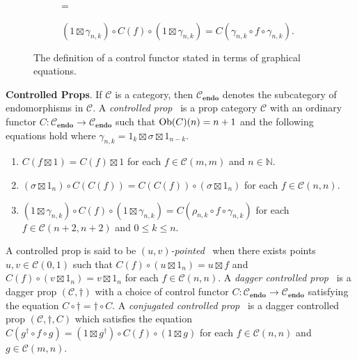 \begin{figure}[t]
    \begin{subfigure}[b]{0.55\textwidth}
        \centering
        =
        \vspace{-0.5em}
        \caption{$( 1 \boxtimes \gamma_{n,k} ) \circ C( f ) \circ ( 1 \boxtimes \gamma_{n,k} ) = C( \gamma_{n,k} \circ f \circ \gamma_{n,k} )$.}
        \label{Fig:ControlDefn:DataSym}
    \end{subfigure}
    \caption{The definition of a control functor stated in terms of graphical equations.}
    \label{Fig:ControlDefn}
\end{figure}

\vspace{1em}
\noindent
\textbf{Controlled Props}.
%
If $\mathcal{C}$ is a category, then $\mathcal{C}_{\mathbf{endo}}$ denotes the subcategory of endomorphisms in $\mathcal{C}$.
A \emph{controlled prop}~\cite{Delorme2025} is a prop category $\mathcal{C}$ with an ordinary functor $C: \mathcal{C}_{\mathbf{endo}} \to \mathcal{C}_{\mathbf{endo}}$ such that $\operatorname{Ob}( C )( n ) = n + 1$ and the following equations hold where $\gamma_{n,k} = 1_k \boxtimes \sigma \boxtimes 1_{n-k}$.
\begin{enumerate}
\item $C( f \boxtimes 1 ) = C( f ) \boxtimes 1$ for each $f \in \mathcal{C}( m, m )$ and $n \in \mathbb{N}$.
\item $( \sigma \boxtimes 1_n ) \circ C( C( f ) ) = C( C( f ) ) \circ ( \sigma \boxtimes 1_n )$ for each $f \in \mathcal{C}( n, n )$.
\item $( 1 \boxtimes \gamma_{n,k} ) \circ C( f ) \circ ( 1 \boxtimes \gamma_{n,k} ) = C( \rho_{n,k} \circ f \circ \gamma_{n,k} )$ for each $f \in \mathcal{C}( n + 2, n + 2 )$ and $0 \le k \le n$.
\end{enumerate}
A controlled prop is said to be \emph{$(u,v)$-pointed}~\cite{Delorme2025} when there exists points $u, v \in \mathcal{C}( 0, 1 )$ such that $C( f ) \circ ( u \boxtimes 1_n ) = u \boxtimes f$ and $C( f ) \circ ( v \boxtimes 1_n ) = v \boxtimes 1_n$ for each $f \in \mathcal{C}( n, n )$.
A \emph{dagger controlled prop}~\cite{Delorme2025} is a dagger prop $( \mathcal{C}, \dagger )$ with a choice of control functor $C: \mathcal{C}_{\mathbf{endo}} \to \mathcal{C}_{\mathbf{endo}}$ satisfying the equation $C \circ \dagger = \dagger \circ C$.
A \emph{conjugated controlled prop}~\cite{Delorme2025} is a dagger controlled prop $( \mathcal{C}, \dagger, C )$ which satisfies the equation $C( g^\dagger \circ f \circ g ) = ( 1 \boxtimes g^\dagger ) \circ C( f ) \circ ( 1 \boxtimes g )$ for each $f \in \mathcal{C}( n, n )$ and $g \in \mathcal{C}( m, n )$.
